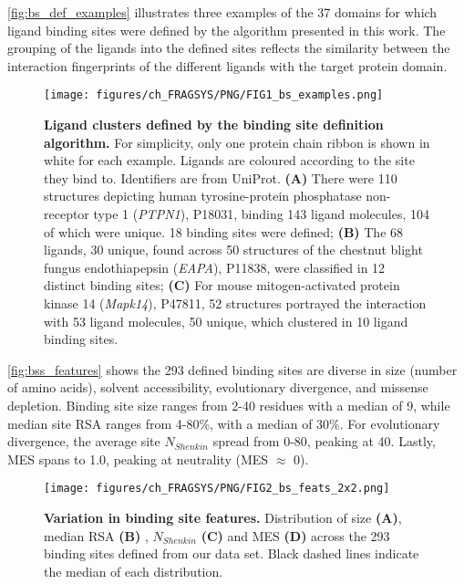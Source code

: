 \autoref{fig:bs_def_examples} illustrates three examples of the 37 domains for which ligand binding sites were defined by the algorithm presented in this work. The grouping of the ligands into the defined sites reflects the similarity between the interaction fingerprints of the different ligands with the target protein domain.

\begin{figure}[ht!]
    \centering
    \texttt{[image: figures/ch\_FRAGSYS/PNG/FIG1\_bs\_examples.png]}
    \caption[Ligand clusters defined by the binding site definition algorithm]{\textbf{Ligand clusters defined by the binding site definition algorithm.} For simplicity, only one protein chain ribbon is shown in white for each example. Ligands are coloured according to the site they bind to. Identifiers are from UniProt. \textbf{(A)} There were 110 structures depicting human tyrosine-protein phosphatase non-receptor type 1 (\textit{PTPN1}), P18031, binding 143 ligand molecules, 104 of which were unique. 18 binding sites were defined; \textbf{(B)} The 68 ligands, 30 unique, found across 50 structures of the chestnut blight fungus endothiapepsin (\textit{EAPA}), P11838, were classified in 12 distinct binding sites; \textbf{(C)} For mouse mitogen-activated protein kinase 14 (\textit{Mapk14}), P47811, 52 structures portrayed the interaction with 53 ligand molecules, 50 unique, which clustered in 10 ligand binding sites.}
    \label{fig:bs_def_examples}
\end{figure}

\autoref{fig:bss_features} shows the 293 defined binding sites are diverse in size (number of amino acids), solvent accessibility, evolutionary divergence, and missense depletion. Binding site size ranges from 2-40 residues with a median of 9, while median site RSA ranges from 4-80\%, with a median of 30\%. For evolutionary divergence, the average site $N_{Shenkin}$ spread from 0-80, peaking at 40. Lastly, MES spans  to 1.0, peaking at neutrality (MES $\approx$ 0).

\begin{figure}[ht!]
    \centering
    \texttt{[image: figures/ch\_FRAGSYS/PNG/FIG2\_bs\_feats\_2x2.png]}
    \caption[Variation in binding site features]{\textbf{Variation in binding site features.} Distribution of size \textbf{(A)}, median RSA \textbf{(B)} , $N_{Shenkin}$ \textbf{(C)} and MES \textbf{(D)} across the 293 binding sites defined from our data set. Black dashed lines indicate the median of each distribution.}
    \label{fig:bss_features}
\end{figure}


